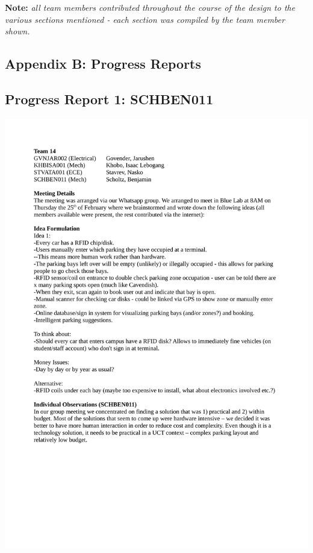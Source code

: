 \vfill
\textbf{Note: }\textit{all team members contributed throughout the course of the design to the various sections mentioned - each section was compiled by the team member shown.}

\newpage
\vspace*{\fill}
\begin{center}
\subsection*{Appendix B: Progress Reports}
\end{center}
\vspace*{\fill}

\newpage
\subsection*{Progress Report 1: SCHBEN011}
\includegraphics[scale=0.9]{meeting/report1-ben.pdf}

